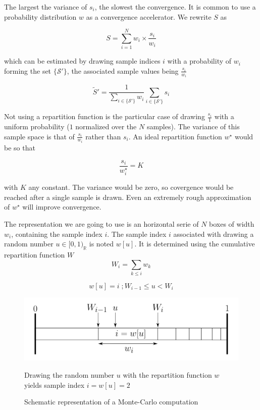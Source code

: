 \documentclass[./thesis.tex]{subfiles}
\begin{document}
The largest the variance of $s_i$, the slowest the convergence. It is common to use a probability distribution $w$ as a convergence accelerator. We rewrite $S$ as 

\begin{equation}
S = \sum_{i=1}^N {w_i \times \frac{s_i}{w_i}}
\end{equation}

which can be estimated by drawing sample indices $i$ with a probability of $w_i$ forming the set $\{\mathcal{S'}\}$, the associated sample values being $\frac{s_i}{w_i}$

\begin{equation}
\tilde S' = \frac{1} {\sum_{i \in \{ \mathcal{S'} \} } w_i} \sum_{i \in \{\mathcal{S'}\}} {s_i}
\end{equation}

Not using a repartition function is the particular case of drawing $\frac{s_i}{1}$ with a uniform probability ($1$ normalized over the $N$ samples). The variance of this sample space is that of $\frac{s_i}{w_i}$ rather than $s_i$. An ideal repartition function $w^\star$ would be so that

\begin{equation}
\frac{s_i}{w^\star_i} = K
\end{equation}

with $K$ any constant. The variance would be zero, so covergence would be reached after a single sample is drawn. Even an extremely rough approximation of $w^\star$ will improve convergence.



The representation we are going to use is an horizontal serie of $N$ boxes of width $w_i$, containing the sample index $i$.
The sample index $i$ associated with drawing a random number $u \in [0,1)_\mathbb{R}$ is noted $w[u]$. It is determined using the cumulative repartition function $W$
\begin{equation}
W_i = \sum_{k \leq i} w_k
\end{equation}

\begin{equation}
w[u] = i \;; W_{i-1} \leq u < W_i
\end{equation}


\begin{figure}[h!]
	\begin{center}
		\includegraphics[width=0.9\columnwidth]{figures/pt2/mc_representation}
		\caption{Schematic representation of a Monte-Carlo computation}
		\label{fig:mc_representation}
		Drawing the random number $u$ with the repartition function $w$ yields sample index $i=w[u] = 2$
	\end{center}
\end{figure}
\end{document}
